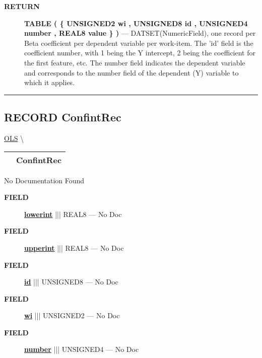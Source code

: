 \par
\begin{description}
\item [\colorbox{tagtype}{\color{white} \textbf{\textsf{RETURN}}}] \textbf{TABLE ( \{ UNSIGNED2 wi , UNSIGNED8 id , UNSIGNED4 number , REAL8 value \} )} --- DATSET(NumericField), one record per Beta coefficient per dependent variable per work-item. The 'id' field is the coefficient number, with 1 being the Y intercept, 2 being the coefficient for the first feature, etc. The number field indicates the dependent variable and corresponds to the number field of the dependent (Y) variable to which it applies.
\end{description}




\rule{\linewidth}{0.5pt}
\subsection*{\textsf{\colorbox{headtoc}{\color{white} RECORD}
ConfintRec}}

\hypertarget{ecldoc:linearregression.ols.confintrec}{}
\hspace{0pt} \hyperlink{ecldoc:linearregression.ols}{OLS} \textbackslash 

{\renewcommand{\arraystretch}{1.5}
\begin{tabularx}{\textwidth}{|>{\raggedright\arraybackslash}l|X|}
\hline
\hspace{0pt}\mytexttt{\color{red} } & \textbf{ConfintRec} \\
\hline
\end{tabularx}
}

\par





No Documentation Found







\par
\begin{description}
\item [\colorbox{tagtype}{\color{white} \textbf{\textsf{FIELD}}}] \textbf{\underline{lowerint}} ||| REAL8 --- No Doc
\item [\colorbox{tagtype}{\color{white} \textbf{\textsf{FIELD}}}] \textbf{\underline{upperint}} ||| REAL8 --- No Doc
\item [\colorbox{tagtype}{\color{white} \textbf{\textsf{FIELD}}}] \textbf{\underline{id}} ||| UNSIGNED8 --- No Doc
\item [\colorbox{tagtype}{\color{white} \textbf{\textsf{FIELD}}}] \textbf{\underline{wi}} ||| UNSIGNED2 --- No Doc
\item [\colorbox{tagtype}{\color{white} \textbf{\textsf{FIELD}}}] \textbf{\underline{number}} ||| UNSIGNED4 --- No Doc
\end{description}





